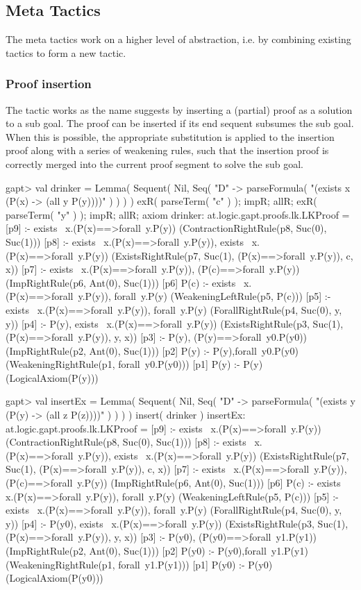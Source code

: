 \documentclass{article}
\newcommand{\cli}[1]{{\ttfamily {#1}}}
\begin{document}
\subsection{Meta Tactics}

The meta tactics work on a higher level of abstraction, i.e. by combining existing tactics to form a new tactic.

\subsubsection*{Proof insertion}
The \cli{insert} tactic works as the name suggests by inserting a (partial) proof as a solution to a sub goal. The proof can be inserted if its end sequent subsumes the sub goal. When this is possible, the appropriate substitution is applied to the insertion proof along with a series of weakening rules, such that the insertion proof is correctly merged into the current proof segment to solve the sub goal.

\begin{clilisting}
gapt> val drinker = Lemma( Sequent( Nil, Seq( "D" -> parseFormula( "(exists x (P(x) -> (all y P(y))))" ) ) ) ) { exR( parseTerm( "c" ) ); impR; allR; exR( parseTerm( "y" ) ); impR; allR; axiom }
drinker: at.logic.gapt.proofs.lk.LKProof =
[p9]  :- exists~ x.(P(x)==>forall~y.P(y))    (ContractionRightRule(p8, Suc(0), Suc(1)))
[p8]  :- exists~ x.(P(x)==>forall~y.P(y)), exists~ x.(P(x)==>forall~y.P(y))    (ExistsRightRule(p7, Suc(1), (P(x)==>forall~y.P(y)), c, x))
[p7]  :- exists~ x.(P(x)==>forall~y.P(y)), (P(c)==>forall~y.P(y))    (ImpRightRule(p6, Ant(0), Suc(1)))
[p6] P(c) :- exists~ x.(P(x)==>forall~y.P(y)), forall~y.P(y)    (WeakeningLeftRule(p5, P(c)))
[p5]  :- exists~ x.(P(x)==>forall~y.P(y)), forall~y.P(y)    (ForallRightRule(p4, Suc(0), y, y))
[p4]  :- P(y), exists~ x.(P(x)==>forall~y.P(y))    (ExistsRightRule(p3, Suc(1), (P(x)==>forall~y.P(y)), y, x))
[p3]  :- P(y), (P(y)==>forall~y0.P(y0))    (ImpRightRule(p2, Ant(0), Suc(1)))
[p2] P(y) :- P(y),forall~y0.P(y0)    (WeakeningRightRule(p1, forall~y0.P(y0)))
[p1] P(y) :- P(y)    (LogicalAxiom(P(y)))

gapt> val insertEx = Lemma( Sequent( Nil, Seq( "D" -> parseFormula( "(exists y (P(y) -> (all z P(z))))" ) ) ) ) { insert( drinker ) }
insertEx: at.logic.gapt.proofs.lk.LKProof =
[p9]  :- exists~ x.(P(x)==>forall~y.P(y))    (ContractionRightRule(p8, Suc(0), Suc(1)))
[p8]  :- exists~ x.(P(x)==>forall~y.P(y)), exists~ x.(P(x)==>forall~y.P(y))    (ExistsRightRule(p7, Suc(1), (P(x)==>forall~y.P(y)), c, x))
[p7]  :- exists~ x.(P(x)==>forall~y.P(y)), (P(c)==>forall~y.P(y))    (ImpRightRule(p6, Ant(0), Suc(1)))
[p6] P(c) :- exists~ x.(P(x)==>forall~y.P(y)), forall~y.P(y)    (WeakeningLeftRule(p5, P(c)))
[p5]  :- exists~ x.(P(x)==>forall~y.P(y)), forall~y.P(y)    (ForallRightRule(p4, Suc(0), y, y))
[p4]  :- P(y0), exists~ x.(P(x)==>forall~y.P(y))    (ExistsRightRule(p3, Suc(1), (P(x)==>forall~y.P(y)), y, x))
[p3]  :- P(y0), (P(y0)==>forall~y1.P(y1))    (ImpRightRule(p2, Ant(0), Suc(1)))
[p2] P(y0) :- P(y0),forall~y1.P(y1)    (WeakeningRightRule(p1, forall~y1.P(y1)))
[p1] P(y0) :- P(y0)    (LogicalAxiom(P(y0)))
\end{clilisting}
\end{document}
